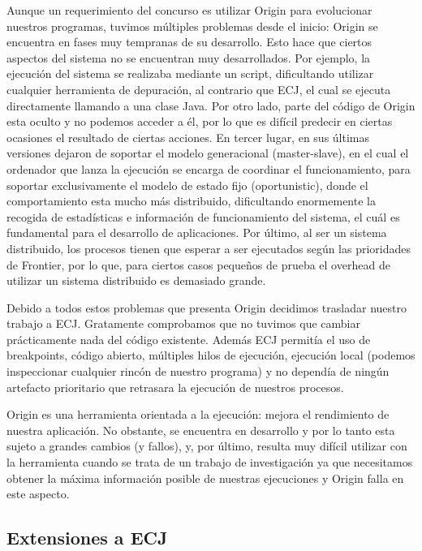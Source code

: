 Aunque un requerimiento del concurso es utilizar Origin para evolucionar nuestros
programas, tuvimos múltiples problemas desde el inicio: Origin se encuentra en
fases muy tempranas de su desarrollo. Esto hace que ciertos aspectos del sistema
no se encuentran muy desarrollados. Por ejemplo, la ejecución del sistema se
realizaba mediante un script, dificultando utilizar cualquier herramienta de
depuración, al contrario que ECJ, el cual se ejecuta directamente llamando a una
clase Java. Por otro lado, parte del código de Origin esta oculto y no podemos
acceder a él, por lo que es difícil predecir en ciertas ocasiones el resultado de
ciertas acciones. En tercer lugar, en sus últimas versiones dejaron de soportar
el modelo generacional (master-slave), en el cual el ordenador que lanza  la
ejecución se encarga de coordinar el funcionamiento, para soportar exclusivamente
el modelo de estado fijo (oportunistic), donde el comportamiento esta mucho más
distribuido, dificultando enormemente la recogida de estadísticas e información
de funcionamiento del sistema, el cuál es fundamental para el desarrollo de
aplicaciones. Por último, al ser un sistema distribuido, los procesos tienen que
esperar a ser ejecutados según las prioridades de Frontier, por lo que, para
ciertos casos pequeños de prueba el overhead de utilizar un sistema distribuido
es demasiado grande.

Debido a todos estos problemas que presenta Origin decidimos trasladar nuestro
trabajo a ECJ. Gratamente comprobamos que no tuvimos que cambiar prácticamente
nada del código existente. Además ECJ permitía el uso de breakpoints, código
abierto, múltiples hilos de ejecución, ejecución local (podemos inspeccionar
cualquier rincón de nuestro programa) y no dependía de ningún artefacto
prioritario que retrasara la ejecución de nuestros procesos.

Origin es una herramienta orientada a la ejecución: mejora el rendimiento de
nuestra aplicación. No obstante, se encuentra en desarrollo y por lo tanto esta
sujeto a grandes cambios (y fallos), y, por último, resulta muy difícil utilizar
con la herramienta cuando se trata de un trabajo de investigación ya que
necesitamos obtener la máxima información posible de nuestras ejecuciones y
Origin falla en este aspecto.

\subsection{Extensiones a ECJ}\label{subsec:mod-ecj}

